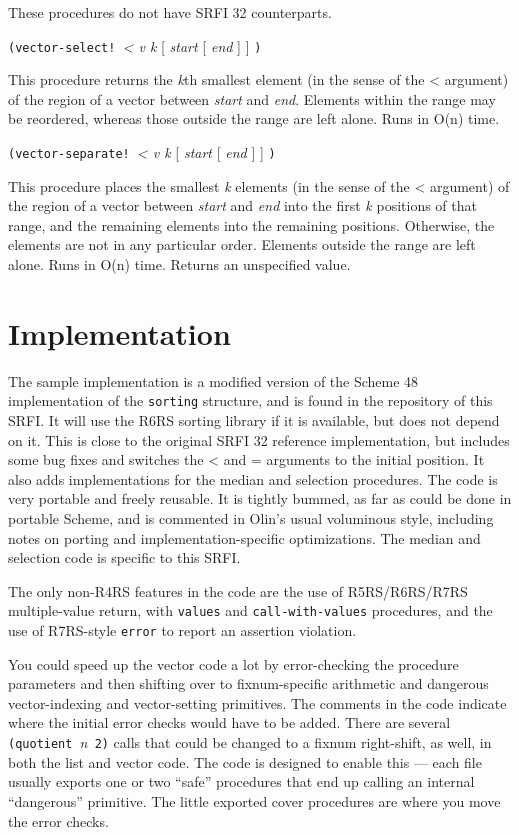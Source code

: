 These procedures do not have SRFI 32 counterparts.

\texttt{(vector-select!\ }\emph{\textless{} v k} {[} \emph{start} {[}
\emph{end} {]} {]} \texttt{)}

This procedure returns the \emph{k}th smallest element (in the sense of
the \textless{} argument) of the region of a vector between \emph{start}
and \emph{end}. Elements within the range may be reordered, whereas
those outside the range are left alone. Runs in O(n) time.

\texttt{(vector-separate!\ }\emph{\textless{} v k} {[} \emph{start} {[}
\emph{end} {]} {]} \texttt{)}

This procedure places the smallest \emph{k} elements (in the sense of
the \textless{} argument) of the region of a vector between \emph{start}
and \emph{end} into the first \emph{k} positions of that range, and the
remaining elements into the remaining positions. Otherwise, the elements
are not in any particular order. Elements outside the range are left
alone. Runs in O(n) time. Returns an unspecified value.

\section{Implementation}\label{implementation}

The sample implementation is a modified version of the Scheme 48
implementation of the \texttt{sorting} structure, and is found in the
repository of this SRFI. It will use the R6RS sorting library if it is
available, but does not depend on it. This is close to the original SRFI
32 reference implementation, but includes some bug fixes and switches
the \textless{} and = arguments to the initial position. It also adds
implementations for the median and selection procedures. The code is
very portable and freely reusable. It is tightly bummed, as far as could
be done in portable Scheme, and is commented in Olin's usual voluminous
style, including notes on porting and implementation-specific
optimizations. The median and selection code is specific to this SRFI.

The only non-R4RS features in the code are the use of R5RS/R6RS/R7RS
multiple-value return, with \texttt{values} and
\texttt{call-with-values} procedures, and the use of R7RS-style
\texttt{error} to report an assertion violation.

You could speed up the vector code a lot by error-checking the procedure
parameters and then shifting over to fixnum-specific arithmetic and
dangerous vector-indexing and vector-setting primitives. The comments in
the code indicate where the initial error checks would have to be added.
There are several \texttt{(quotient\ }\emph{n}\texttt{\ 2)} calls that
could be changed to a fixnum right-shift, as well, in both the list and
vector code. The code is designed to enable this --- each file usually
exports one or two ``safe'' procedures that end up calling an internal
``dangerous'' primitive. The little exported cover procedures are where
you move the error checks.

